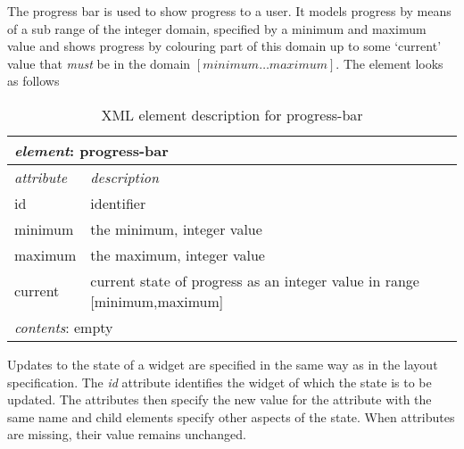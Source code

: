 \documentclass{article}
\begin{document}

   \noindent The progress bar is used to show progress to a user. It models progress by
   means of a sub range of the integer domain, specified by a minimum and
   maximum value and shows progress by colouring part of this domain up to some
   `current' value that \emph{must} be in the domain $[ minimum \ldots maximum
   ]$. The element looks as follows

    \begin{table}[H]
     \begin{center}
     \begin{tabular}{|l|l|}
       \hline
        \multicolumn{2}{|l|}{\textit{element}: progress-bar} \\
       \hline \hline
        \textit{attribute} & \textit{description} \\
       \hline
        id                 & identifier \\
        minimum            & the minimum, integer value \\
        maximum            & the maximum, integer value \\
        current            & current state of progress as an integer value in range [minimum,maximum]  \\
       \hline \hline
        \multicolumn{2}{|l|}{\textit{contents}: empty} \\
       \hline
     \end{tabular}
     \end{center}
     \label{figure:element_progress_bar}
     \caption{XML element description for progress-bar}
    \end{table}

%
   \noindent Updates to the state of a widget are specified in the same way as
   in the layout specification. The \textit{id} attribute identifies the
   widget of which the state is to be updated. The attributes then specify the
   new value for the attribute with the same name and child elements specify
   other aspects of the state. When attributes are missing, their value remains
   unchanged.
\end{document}
